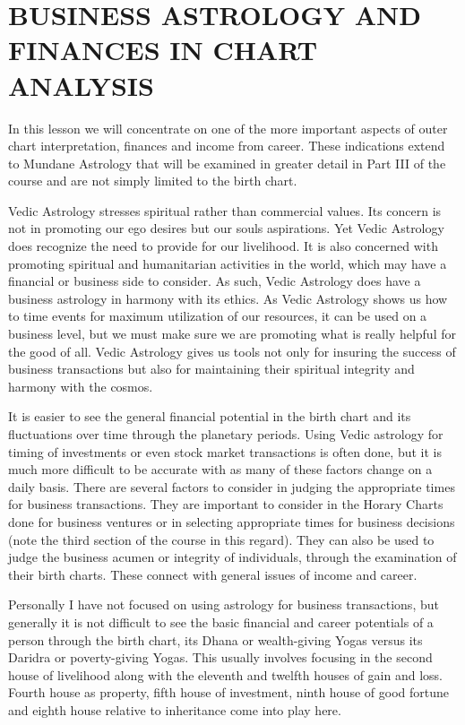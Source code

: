 
\section{BUSINESS ASTROLOGY AND FINANCES IN CHART ANALYSIS}
 

In this lesson we will concentrate on one of the more important aspects of outer chart interpretation, finances and income from career. These indications extend to Mundane Astrology that will be examined in greater detail in Part III of the course and are not simply limited to the birth chart.

 

Vedic Astrology stresses spiritual rather than commercial values. Its concern is not in promoting our ego desires but our souls aspirations. Yet Vedic Astrology does recognize the need to provide for our livelihood. It is also concerned with promoting spiritual and humanitarian activities in the world, which may have a financial or business side to consider. As such, Vedic Astrology does have a business astrology in harmony with its ethics. As Vedic Astrology shows us how to time events for maximum utilization of our resources, it can be used on a business level, but we must make sure we are promoting what is really helpful for the good of all. Vedic Astrology gives us tools not only for insuring the success of business transactions but also for maintaining their spiritual integrity and harmony with the cosmos.

 

It is easier to see the general financial potential in the birth chart and its fluctuations over time through the planetary periods. Using Vedic astrology for timing of investments or even stock market transactions is often done, but it is much more difficult to be accurate with as many of these factors change on a daily basis. There are several factors to consider in judging the appropriate times for business transactions. They are important to consider in the Horary Charts done for business ventures or in selecting appropriate times for business decisions (note the third section of the course in this regard). They can also be used to judge the business acumen or integrity of individuals, through the examination of their birth charts. These connect with general issues of income and career.

 

Personally I have not focused on using astrology for business transactions, but generally it is not difficult to see the basic financial and career potentials of a person through the birth chart, its Dhana or wealth-giving Yogas versus its Daridra or poverty-giving Yogas. This usually involves focusing in the second house of livelihood along with the eleventh and twelfth houses of gain and loss. Fourth house as property, fifth house of investment, ninth house of good fortune and eighth house relative to inheritance come into play here.

